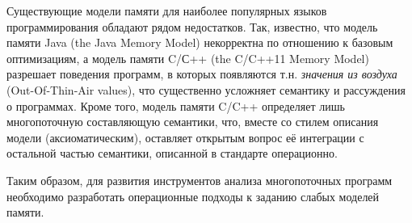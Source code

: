 Существующие модели памяти для наиболее популярных языков программирования обладают рядом недостатков.
Так, известно, что модель памяти Java (the Java Memory Model) некорректна по отношению
к базовым оптимизациям, а модель памяти C/С++ (the C/C++11 Memory Model) разрешает
поведения программ, в которых появляются т.н. \emph{значения из воздуха} (Out-Of-Thin-Air values),
что существенно усложняет семантику и рассуждения о программах.
Кроме того, модель памяти C/C++ определяет лишь многопоточную составляющую семантики, что, вместе со стилем
описания модели (аксиоматическим), оставляет открытым вопрос её интеграции с остальной частью семантики,
описанной в стандарте операционно.

Таким образом, для развития инструментов анализа многопоточных программ необходимо
разработать операционные подходы к заданию слабых моделей памяти.



